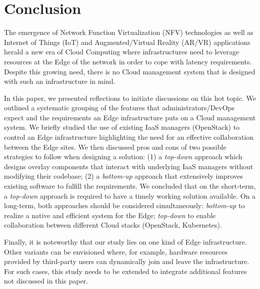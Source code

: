 \section{Conclusion}
\label{sec:conclusion}

The emergence of Network Function Virtualization (NFV) technologies as
well as Internet of Things (IoT) and Augmented/Virtual Reality (AR/VR)
applications herald a new era of Cloud Computing where infrastructures
need to leverage resources at the Edge of the network in order to cope
with latency requirements.  Despite this growing need, there is no
Cloud management system that is designed with such an infrastructure
in mind.

In this paper, we presented reflections to initiate discussions on this
hot topic. 
We outlined a systematic grouping of the features that administrators/DevOps
expect and the requirements an Edge infrastructure puts on a Cloud management
system.
We briefly studied the use of existing IaaS managers (\ie OpenStack)
to control an Edge infrastructure highlighting the need for an
effective collaboration between the Edge sites.  
We then discussed pros and cons of two possible strategies to follow when
designing a solution: (1) a \emph{top-down} approach which designs overlay
components that interact with underlying IaaS managers without modifying their
codebase; (2) a \emph{bottom-up} approach that extensively
improves existing software to fulfill the requirements. We concluded
that on the short-term, a \emph{top-down} approach is required to have
a timely working solution available. On a long-term, both approaches should be
considered simultaneously: \emph{bottom-up} to realize a native and efficient
system for the Edge; \emph{top-down} to enable collaboration between different
Cloud stacks (\eg OpenStack, Kubernetes).

Finally, it is noteworthy that our study lies on one kind of Edge
infrastructure. Other variants can be envisioned where, for example,
hardware resources provided by third-party users can dynamically join
and leave the infrastructure. For such cases, this study needs to be
extended to integrate additional features not discussed in this paper.

